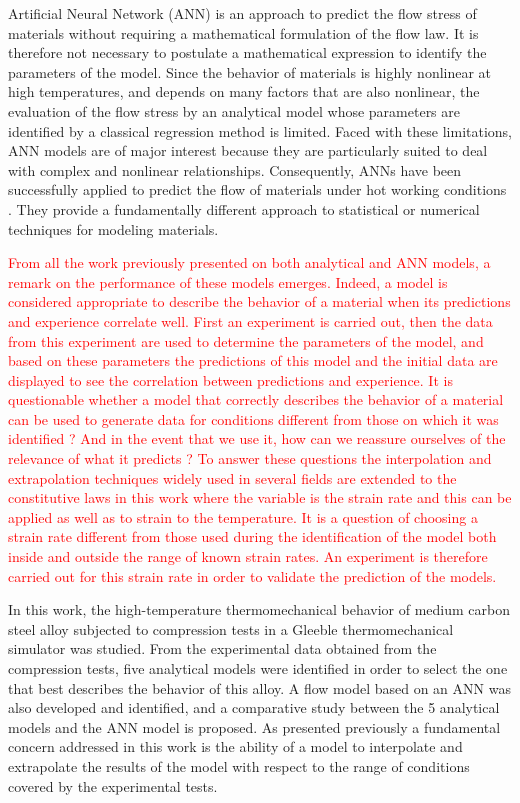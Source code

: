 \documentclass[twoside,english,1p,final,sort&compress]{elsarticle}
\theoremstyle{plain}
\begin{document}
Artificial Neural Network (ANN) is an approach to predict the flow stress of materials without requiring a mathematical formulation of the flow law. It is therefore not necessary to postulate a mathematical expression to identify the parameters of the model. Since the behavior of materials is highly nonlinear at high temperatures, and depends on many factors that are also nonlinear, the evaluation of the flow stress by an analytical model whose parameters are identified by a classical regression method is limited. Faced with these limitations, ANN models are of major interest because they are particularly suited to deal with complex and nonlinear relationships. Consequently, ANNs have been successfully applied to predict the flow of materials under hot working conditions \cite{Lin-2008-ANN, Lu-2011-ANN, Ashtiani-2016-CSP, Stoffel-2019-NNB, Pantale-2021}. They provide a fundamentally different approach to statistical or numerical techniques for modeling materials.

\textcolor{red}{From all the work previously presented on both analytical and ANN models, a remark on the performance of these models emerges. Indeed, a model is considered appropriate to describe the behavior of a material when its predictions and experience correlate well. First an experiment is carried out, then the data from this experiment are used to determine the parameters of the model, and based on these parameters the predictions of this model and the initial data are displayed to see the correlation between predictions and experience. It is questionable whether a model that correctly describes the behavior of a material can be used to generate data for conditions different from those on which it was identified ? And in the event that we use it, how can we reassure ourselves of the relevance of what it predicts ? To answer these questions the interpolation and extrapolation techniques \cite{wahab2017interpolation,luo2019interpolation,stinis2019enforcing} widely used in several fields are extended to the constitutive laws in this work where the variable is the strain rate and this can be applied as well as to strain to the temperature. It is a question of choosing a strain rate different from those used during the identification of the model both inside and outside the range of known strain rates. An experiment is therefore carried out for this strain rate in order to validate the prediction of the models.}

In this work, the high-temperature thermomechanical behavior of medium carbon steel alloy subjected to compression tests in a Gleeble thermomechanical simulator was studied. From the experimental data obtained from the compression tests, five analytical models were identified in order to select the one that best describes the behavior of this alloy. A flow model based on an ANN was also developed and identified, and a comparative study between the 5 analytical models and the ANN model is proposed.
As presented previously a fundamental concern addressed in this work is the ability of a model to interpolate and extrapolate the results of the model with respect to the range of conditions covered by the experimental tests.
\end{document}

